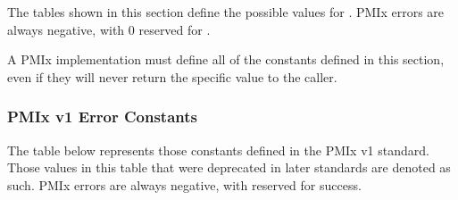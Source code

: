 The tables shown in this section define the possible values for .
PMIx errors are always negative, with 0 reserved for .

A PMIx implementation must define all of the constants defined in this section, even if they will never return the specific value to the caller.

\subsubsection{PMIx v1 Error Constants}

The table below represents those constants defined in the PMIx v1 standard.
Those values in this table that were deprecated in later standards are denoted as such.
\ac{PMIx} errors are always negative, with  reserved for success.

